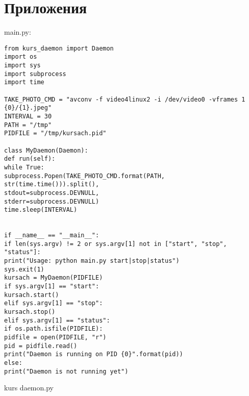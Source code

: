 \documentclass[12pt,a4paper]{scrartcl}
\begin{document}
\section{Приложения}
main.py:\begin{verbatim}
from kurs_daemon import Daemon
import os
import sys
import subprocess
import time

TAKE_PHOTO_CMD = "avconv -f video4linux2 -i /dev/video0 -vframes 1 {0}/{1}.jpeg"
INTERVAL = 30
PATH = "/tmp"
PIDFILE = "/tmp/kursach.pid"

class MyDaemon(Daemon):
def run(self):
while True:
subprocess.Popen(TAKE_PHOTO_CMD.format(PATH, str(time.time())).split(),
stdout=subprocess.DEVNULL,
stderr=subprocess.DEVNULL)
time.sleep(INTERVAL)


if __name__ == "__main__":
if len(sys.argv) != 2 or sys.argv[1] not in ["start", "stop", "status"]:
print("Usage: python main.py start|stop|status")
sys.exit(1)
kursach = MyDaemon(PIDFILE)
if sys.argv[1] == "start":
kursach.start()
elif sys.argv[1] == "stop":
kursach.stop()
elif sys.argv[1] == "status":
if os.path.isfile(PIDFILE):
pidfile = open(PIDFILE, "r")
pid = pidfile.read()
print("Daemon is running on PID {0}".format(pid))
else:
print("Daemon is not running yet")
\end{verbatim} kurs daemon.py 
\end{document}
